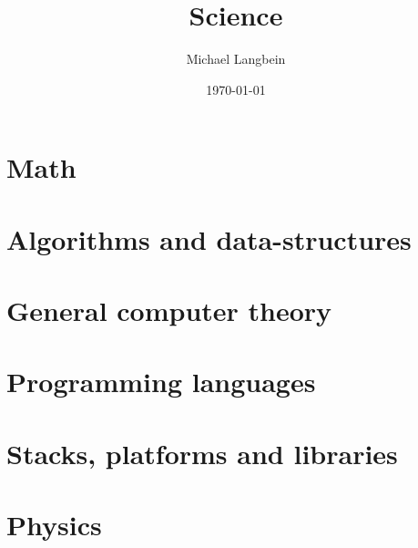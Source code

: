 \documentclass{book}
\title{Science}
\author{Michael Langbein}
\date{\today}
\begin{document}
\maketitle
\tableofcontents

\chapter{Math}








%







%



\chapter{Algorithms and data-structures}



\chapter{General computer theory}








\chapter{Programming languages}





%




%

\chapter{Stacks, platforms and libraries}






\chapter{Physics}

\end{document}
